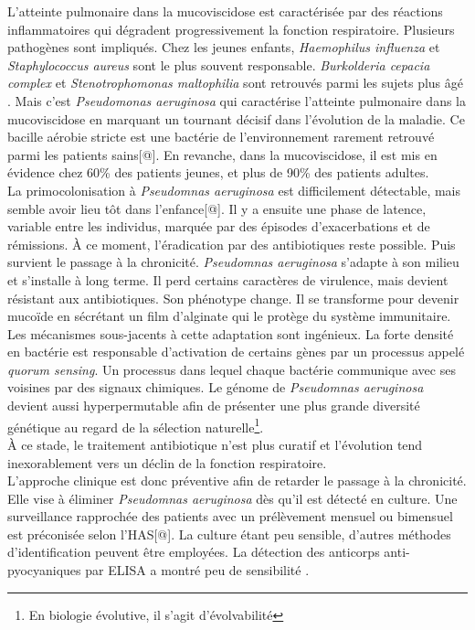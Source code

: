 \documentclass[12pt,a4paper]{article}
\begin{document}
L’atteinte pulmonaire dans la mucoviscidose est caractérisée par des réactions inflammatoires qui dégradent progressivement la fonction respiratoire. Plusieurs pathogènes sont impliqués. Chez les jeunes enfants\cite{Davies}, \textit{Haemophilus influenza} et \textit{Staphylococcus aureus} sont le plus souvent responsable. \textit{Burkolderia cepacia complex} et \textit{Stenotrophomonas maltophilia} sont retrouvés parmi les sujets plus âgé \cite{Davies}.
Mais c’est \textit{Pseudomonas aeruginosa} qui caractérise l’atteinte pulmonaire dans la mucoviscidose en marquant un tournant décisif dans l’évolution de la maladie. Ce bacille aérobie stricte est une bactérie de l'environnement rarement retrouvé parmi les patients sains[@]. En revanche, dans la mucoviscidose, il est mis en évidence chez 60\%\cite{LeBourgeois} des patients jeunes, et plus de 90\% des patients adultes\cite{LeBourgeois}.\\
La primocolonisation à \textit{Pseudomnas aeruginosa} est difficilement détectable, mais semble avoir lieu tôt dans l’enfance[@]. Il y a ensuite une phase de latence, variable entre les individus, marquée par des épisodes d’exacerbations et de rémissions. À ce moment, l’éradication par des antibiotiques reste possible.
Puis survient le passage à la chronicité. \textit{Pseudomnas aeruginosa} s'adapte à son milieu et s’installe à long terme. Il perd certains caractères de virulence, mais devient résistant aux antibiotiques\cite{LeBourgeois}. Son phénotype change. Il se transforme pour devenir mucoïde en sécrétant un film d’alginate qui le protège du système immunitaire. Les mécanismes sous-jacents à cette adaptation sont ingénieux. La forte densité en bactérie est responsable d’activation de certains gènes par un processus appelé \textit{quorum sensing}\cite{Ruimy2004}. Un processus dans lequel chaque bactérie communique avec ses voisines par des signaux chimiques.
Le génome de \textit{Pseudomnas aeruginosa} devient aussi hyperpermutable\cite{Davies} afin de présenter une plus grande diversité génétique au regard de la sélection naturelle\footnote{En biologie évolutive, il s'agit d'évolvabilité}. \\
À ce stade, le traitement antibiotique n’est plus curatif et l'évolution tend inexorablement vers un déclin de la fonction respiratoire. \\
L'approche clinique est donc préventive afin de retarder le passage à la chronicité. Elle vise à éliminer \textit{Pseudomnas aeruginosa} dès qu'il est détecté en culture. Une surveillance rapprochée des patients avec un prélèvement mensuel ou bimensuel est préconisée selon l'HAS[@]. La culture étant peu sensible, d’autres méthodes d'identification peuvent être employées. La détection des anticorps anti-pyocyaniques par ELISA a montré peu de sensibilité \cite{Plesiat}.
\end{document}
